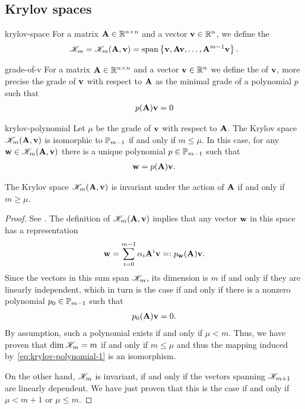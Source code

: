 \subsection{Krylov spaces}

\begin{Definition}{krylov-space}
  For a matrix $\mata\in\Rnn$ and a vector $\vv\in\R^n$, we define the
  \begin{gather}
    \krylov_m = \krylov_m(\mata,\vv)
    = \spann{\vv,\mata\vv,\dots,\mata^{m-1}\vv}.
  \end{gather}
\end{Definition}

\begin{Definition}{grade-of-v}
  For a matrix $\mata\in\Rnn$ and a vector $\vv\in\R^n$ we define the
   of $\vv$, more precise the grade of $\vv$ with
  respect to $\mata$ as the minimal grade of a polynomial $p$ such
  that
  \begin{gather}
    p(\mata)\vv = 0
  \end{gather}
\end{Definition}

\begin{Lemma}{krylov-polynomial}
  Let $\mu$ be the grade of $\vv$ with respect to $\mata$.  The Krylov
  space $\krylov_m(\mata,\vv)$ is isomorphic to $\P_{m-1}$ if and only
  if $m\le \mu$. In this case, for any $\vw\in\krylov_m(\mata,\vv)$
  there is a unique polynomial $p\in\P_{m-1}$ such that
  \begin{gather}
    \label{eq:krylov-polynomial-1}
    \vw = p(\mata)\vv.
  \end{gather}

  The Krylov space $\krylov_m(\mata,\vv)$ is invariant under the
  action of $\mata$ if and only if $m\ge\mu$.
\end{Lemma}

\begin{proof}
  See \cite[Propositions 6.1 \& 6.2]{Saad00}.
  The definition of $\krylov_m(\mata,\vv)$ implies that any vector $\vw$ in this space has a representation
  \begin{gather}
    \vw = \sum_{i=0}^{m-1} \alpha_i \mata^i\vv =: p_{\vw}(\mata) \vv.
  \end{gather}
  Since the vectors in this sum span $\krylov_m$, its dimension is
  $m$ if and only if they are linearly independent, which in turn is
  the case if and only if there is a nonzero polynomial
  $p_0\in\P_{m-1}$ such that
  \begin{gather}
    p_0(\mata)\vv = 0.
  \end{gather}
  By assumption, such a polynomial exists if and only if
  $\mu<m$. Thus, we have proven that $\dim \krylov_m = m$ if and only
  if $m\le \mu$ and thus the mapping induced
  by~\eqref{eq:krylov-polynomial-1} is an isomorphism.

  On the other hand, $\krylov_m$ is invariant, if and only if the
  vectors spanning $\krylov_{m+1}$ are linearly dependent. We have
  just proven that this is the case if and only if $\mu<m+1$ or
  $\mu\le m$.
\end{proof}

